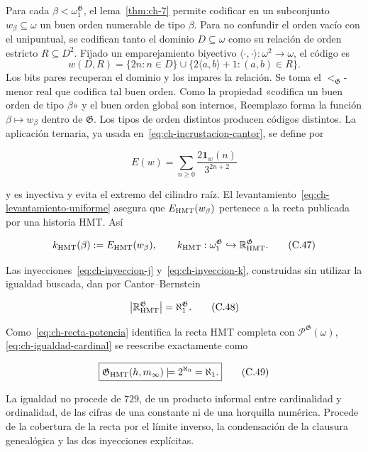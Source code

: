 Para cada \(\beta<\omega_1^{\mathfrak G}\), el lema~\ref{thm:ch-7} permite codificar en un
subconjunto \(w_\beta\subseteq\omega\) un buen orden numerable de tipo
\(\beta\). Para no confundir el orden vacío con el unipuntual, se codifican
tanto el dominio \(D\subseteq\omega\) como su relación de orden estricto
\(R\subseteq D^2\). Fijado un emparejamiento biyectivo
\(\langle\cdot,\cdot\rangle:\omega^2\to\omega\), el código es
\[
 w(D,R)=\{2n:n\in D\}\cup
        \{2\langle a,b\rangle+1:(a,b)\in R\}.
\]
Los bits pares recuperan el dominio y los impares la relación. Se toma el
\(<_{\mathfrak G}\)-menor real que codifica tal buen orden. Como la propiedad
«codifica un buen orden de tipo \(\beta\)» y el buen orden global son internos,
Reemplazo forma la función \(\beta\mapsto w_\beta\) dentro de
\(\mathfrak G\). Los tipos de orden distintos producen códigos distintos. La
aplicación ternaria, ya usada en~\eqref{eq:ch-incrustacion-cantor}, se define por

\[
 E(w)=\sum_{n\ge0}\frac{2\mathbf1_w(n)}{3^{2n+2}}
\tag{C.46}\label{eq:ch-incrustacion-ternaria}
\]

y es inyectiva y evita el extremo del cilindro raíz. El levantamiento~\eqref{eq:ch-levantamiento-uniforme}
asegura que \(E_{\rm HMT}(w_\beta)\) pertenece a la recta publicada por una
historia HMT. Así

\[
 k_{\rm HMT}(\beta):=E_{\rm HMT}(w_\beta),
 \qquad
 k_{\rm HMT}:\omega_1^{\mathfrak G}
 \hookrightarrow\mathbb R_{\rm HMT}^{\mathfrak G}.
\tag{C.47}\label{eq:ch-inyeccion-k}
\]

Las inyecciones~\eqref{eq:ch-inyeccion-j} y~\eqref{eq:ch-inyeccion-k}, construidas sin utilizar la igualdad buscada,
dan por Cantor--Bernstein

\[
 \bigl|\mathbb R_{\rm HMT}^{\mathfrak G}\bigr|
 =\aleph_1^{\mathfrak G}.
\tag{C.48}\label{eq:ch-igualdad-cardinal}
\]

Como~\eqref{eq:ch-recta-potencia} identifica la recta HMT completa con
\(\mathcal P^{\mathfrak G}(\omega)\), \eqref{eq:ch-igualdad-cardinal} se reescribe exactamente como

\[
 \boxed{
  \mathfrak G_{\rm HMT}(h,m_\infty)
  \models 2^{\aleph_0}=\aleph_1.}
\tag{C.49}\label{eq:ch-decision}
\]

La igualdad no procede de \(729\), de un producto informal entre cardinalidad
y ordinalidad, de las cifras de una constante ni de una horquilla numérica.
Procede de la cobertura de la recta por el límite inverso, la condensación de
la clausura genealógica y las dos inyecciones explícitas.

